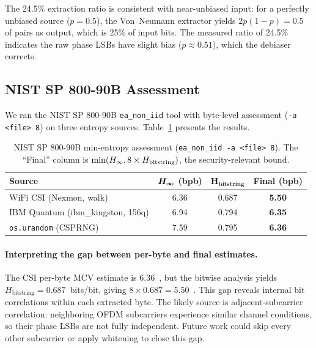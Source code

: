 The 24.5\% extraction ratio is consistent with near-unbiased input: for a perfectly unbiased source ($p = 0.5$), the Von~Neumann extractor yields $2p(1-p) = 0.5$ of pairs as output, which is 25\% of input bits.
The measured ratio of 24.5\% indicates the raw phase LSBs have slight bias ($p \approx 0.51$), which the debiaser corrects.

\subsection{NIST SP 800-90B Assessment}
\label{subsec:nist-results}

We ran the NIST SP 800-90B \texttt{ea\_non\_iid} tool with byte-level assessment (\texttt{-a <file> 8}) on three entropy sources.
Table~\ref{tab:nist} presents the results.

\begin{table}[t]
\centering
\caption{NIST SP 800-90B min-entropy assessment (\texttt{ea\_non\_iid -a <file> 8}). The ``Final'' column is $\min(H_{\infty}, 8 \times H_{\text{bitstring}})$, the security-relevant bound.}
\label{tab:nist}
\small
\begin{tabular}{@{}lccc@{}}
\toprule
\textbf{Source} & $\boldsymbol{H_{\infty}}$ \textbf{(bpb)} & $\boldsymbol{H_{\text{bitstring}}}$ & \textbf{Final (bpb)} \\
\midrule
WiFi CSI (Nexmon, walk) & 6.36 & 0.687 & \textbf{5.50} \\
IBM Quantum (ibm\_kingston, 156q) & 6.94 & 0.794 & \textbf{6.35} \\
\texttt{os.urandom} (CSPRNG) & 7.59 & 0.795 & \textbf{6.36} \\
\bottomrule
\end{tabular}
\end{table}

\paragraph{Interpreting the gap between per-byte and final estimates.}
The CSI per-byte MCV estimate is 6.36~\bpb, but the bitwise analysis yields $H_{\text{bitstring}} = 0.687$~bits/bit, giving $8 \times 0.687 = 5.50$~\bpb.
This gap reveals internal bit correlations within each extracted byte.
The likely source is adjacent-subcarrier correlation: neighboring OFDM subcarriers experience similar channel conditions, so their phase LSBs are not fully independent.
Future work could skip every other subcarrier or apply whitening to close this gap.

